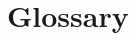 \documentclass[oneside,12pt,online,a4paper,pdfa1,numbered,biblatex,fontC]{PhDthesisTUB}
\begin{document}
\tableofcontents            %

\cleardoublepage
\listoffigures	%
\cleardoublepage
\listoftables  %



\cleardoublepage
\chapter{Glossary}\label{ch:glossary}
\begin{multicols}{2} %
    \begin{footnotesize} %
        \ifCLASSINFOlangDE
            \printglossary[type=\acronymtype,title=Abkürzungsverzeichnis]
        \else
            \printglossary[type=\acronymtype,title=Abbreviations]
        \fi
        \label{nom} %

    \end{footnotesize}
\end{multicols}


\begin{multicols}{2} %
    \begin{footnotesize}
        \printglossary[type=symbolslist,title=Symbols]

    \end{footnotesize}
\end{multicols}

\mainmatter

\end{document}
